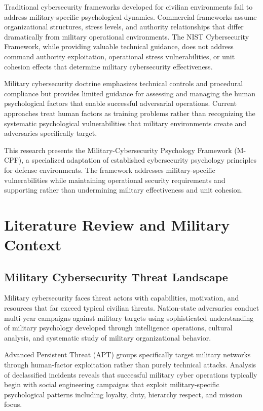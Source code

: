 \documentclass[10pt, twocolumn]{article}
\begin{document}
Traditional cybersecurity frameworks developed for civilian environments fail to address military-specific psychological dynamics. Commercial frameworks assume organizational structures, stress levels, and authority relationships that differ dramatically from military operational environments. The NIST Cybersecurity Framework, while providing valuable technical guidance, does not address command authority exploitation, operational stress vulnerabilities, or unit cohesion effects that determine military cybersecurity effectiveness.

Military cybersecurity doctrine emphasizes technical controls and procedural compliance but provides limited guidance for assessing and managing the human psychological factors that enable successful adversarial operations. Current approaches treat human factors as training problems rather than recognizing the systematic psychological vulnerabilities that military environments create and adversaries specifically target.

This research presents the Military-Cybersecurity Psychology Framework (M-CPF), a specialized adaptation of established cybersecurity psychology principles for defense environments. The framework addresses military-specific vulnerabilities while maintaining operational security requirements and supporting rather than undermining military effectiveness and unit cohesion.

\section{Literature Review and Military Context}

\subsection{Military Cybersecurity Threat Landscape}

Military cybersecurity faces threat actors with capabilities, motivation, and resources that far exceed typical civilian threats. Nation-state adversaries conduct multi-year campaigns against military targets using sophisticated understanding of military psychology developed through intelligence operations, cultural analysis, and systematic study of military organizational behavior.

Advanced Persistent Threat (APT) groups specifically target military networks through human-factor exploitation rather than purely technical attacks. Analysis of declassified incidents reveals that successful military cyber operations typically begin with social engineering campaigns that exploit military-specific psychological patterns including loyalty, duty, hierarchy respect, and mission focus\cite{disa2024}.
\end{document}
